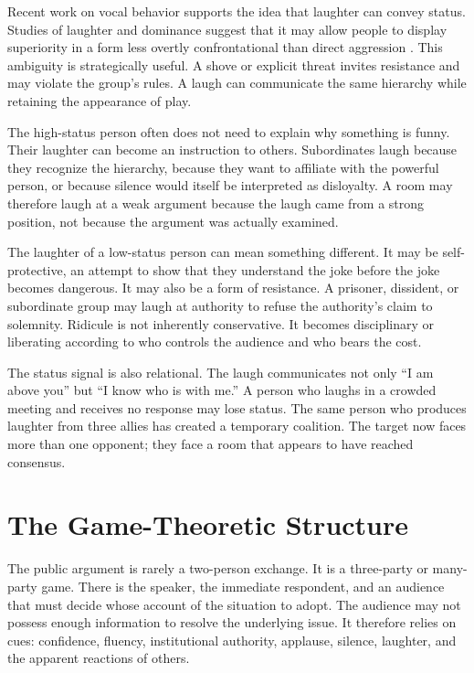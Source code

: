 ﻿\documentclass[12pt,a4paper]{book}
\begin{document}
Recent work on vocal behavior supports the idea that laughter can convey status. Studies of laughter and dominance suggest that it may allow people to display superiority in a form less overtly confrontational than direct aggression \cite{bachorowski2016}. This ambiguity is strategically useful. A shove or explicit threat invites resistance and may violate the group's rules. A laugh can communicate the same hierarchy while retaining the appearance of play.

The high-status person often does not need to explain why something is funny. Their laughter can become an instruction to others. Subordinates laugh because they recognize the hierarchy, because they want to affiliate with the powerful person, or because silence would itself be interpreted as disloyalty. A room may therefore laugh at a weak argument because the laugh came from a strong position, not because the argument was actually examined.

The laughter of a low-status person can mean something different. It may be self-protective, an attempt to show that they understand the joke before the joke becomes dangerous. It may also be a form of resistance. A prisoner, dissident, or subordinate group may laugh at authority to refuse the authority's claim to solemnity. Ridicule is not inherently conservative. It becomes disciplinary or liberating according to who controls the audience and who bears the cost.

The status signal is also relational. The laugh communicates not only ``I am above you'' but ``I know who is with me.'' A person who laughs in a crowded meeting and receives no response may lose status. The same person who produces laughter from three allies has created a temporary coalition. The target now faces more than one opponent; they face a room that appears to have reached consensus.

\section{The Game-Theoretic Structure}

The public argument is rarely a two-person exchange. It is a three-party or many-party game. There is the speaker, the immediate respondent, and an audience that must decide whose account of the situation to adopt. The audience may not possess enough information to resolve the underlying issue. It therefore relies on cues: confidence, fluency, institutional authority, applause, silence, laughter, and the apparent reactions of others.
\end{document}

